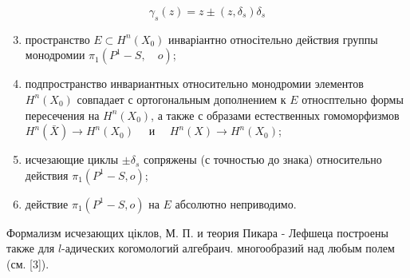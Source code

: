 \documentclass[10pt]{article}
\begin{document}
\[

\gamma_{s}(z)=z \pm\left(z, \delta_{s}\right) \delta_{s}

\]



\begin{enumerate}

  \setcounter{enumi}{2}

  \item пространство $E \subset H^{n}\left(X_{0}\right)$ инваріантно относітельно действия группы монодромии $\pi_{1}\left(P^{1}-S, \quad o\right)$;



  \item подпространство инвариантных относительно монодромии элементов $H^{n}\left(X_{0}\right)$ совпадает с ортогональным дополнением к $E$ относптельно формы пересечения на $H^{n}\left(X_{0}\right)$, а также с образами естественных гомоморфизмов $H^{n}(\bar{X}) \rightarrow H^{n}\left(X_{0}\right) \quad$ и $\quad H^{n}(X) \rightarrow H^{n}\left(X_{0}\right)$;



  \item исчезающие циклы $\pm \delta_{s}$ сопряжены (с точностью до знака) относительно действия $\pi_{1}\left(P^{1}-S, o\right)$;



  \item действие $\pi_{1}\left(P^{1}-S, o\right)$ на $E$ абсолютно неприводимо.



\end{enumerate}



Формализм исчезающих ціклов, М. П. и теория Пикара - Лефшеца построены также для $l$-адических когомологий алгебраич. многообразий над любым полем (см. [3]).
\end{document}
